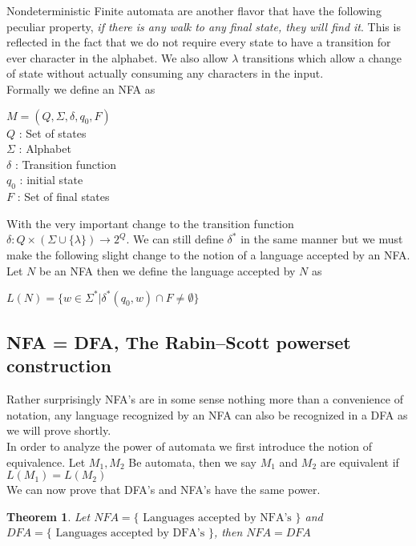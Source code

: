 \documentclass[11pt]{exam}
\newtheorem{theorem}{Theorem}[section]
\begin{document}
Nondeterministic Finite automata are another flavor that have the following peculiar property, \emph{if there is any walk to any final state, they will find it}. This is reflected in the fact that we do not require every state to have a transition for ever character in the alphabet. We also allow $\lambda$ transitions which allow a change of state without actually consuming any characters in the input.\\

\newpage 
Formally we define an NFA as
\begin{center}
$M = (Q,\Sigma,\delta,q_0,F)$\\
$Q$ : Set of states\\
$\Sigma$ : Alphabet\\
$\delta$ : Transition function\\
$q_0$ : initial state\\
$F$ : Set of final states\\
\end{center}
With the very important change to the transition function $\delta : Q \times (\Sigma \cup \{\lambda\}) \rightarrow 2^Q$.
We can still define $\delta^*$ in the same manner but we must make the following slight change to the notion of a language accepted by an NFA.\\

Let $N$ be an NFA then we define the language accepted by $N$ as 
\begin{center}
$L(N) = \{w \in \Sigma^* | \delta^*(q_0, w) \cap F \neq \emptyset \}$
\end{center}

\subsection{NFA = DFA, The Rabin–Scott powerset construction}
Rather surprisingly NFA's are in some sense nothing more than a convenience of notation, any language recognized by an NFA can also be recognized in a DFA as we will prove shortly.\\

In order to analyze the power of automata we first introduce the notion of equivalence. Let $M_1,M_2$ Be automata, then we say $M_1$ and $M_2$ are equivalent if $L(M_1) = L(M_2)$\\

We can now prove that DFA's and NFA's have the same power.


\begin{theorem}
Let $NFA = \{\text{ Languages accepted by NFA's } \}$ and $DFA = \{ \text{ Languages accepted by DFA's } \}$, then $NFA = DFA$\\
\end{theorem}
\end{document}
